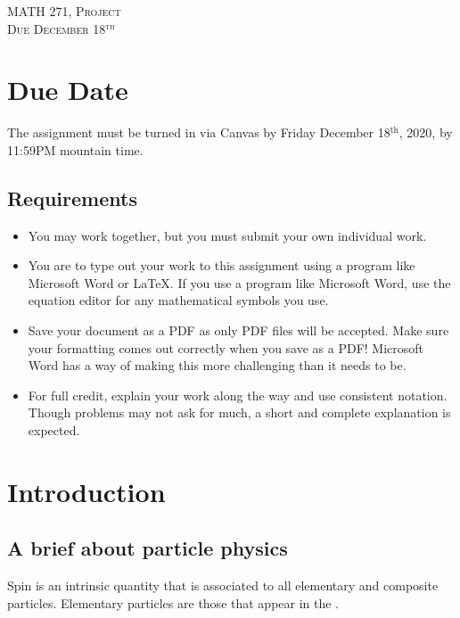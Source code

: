 \documentclass{article}
\begin{document}
\begin{center}
   \LARGE{\textsc{MATH 271, Project}}\\
   \large{\textsc{Due December 18$^\textrm{th}$}}
\end{center}
\vspace{.5cm}

\section*{Due Date}
The assignment must be turned in via Canvas by Friday December 18$^\textrm{th}$, 2020, by 11:59PM mountain time.
\subsection*{Requirements}
\begin{itemize}
    \item You may work together, but you must submit your own individual work.
    \item You are to type out your work to this assignment using a program like Microsoft Word or \LaTeX. If you use a program like Microsoft Word, use the equation editor for any mathematical symbols you use. 
    \item Save your document as a PDF as only PDF files will be accepted. Make sure your formatting comes out correctly when you save as a PDF! Microsoft Word has a way of making this more challenging than it needs to be.
    \item For full credit, explain your work along the way and use consistent notation.  Though problems may not ask for much, a short and complete explanation is expected.
\end{itemize}


\section{Introduction}

\subsection{A brief about particle physics}

Spin is an intrinsic quantity that is associated to all elementary and composite particles.  Elementary particles are those that appear in the . 
\end{document}
